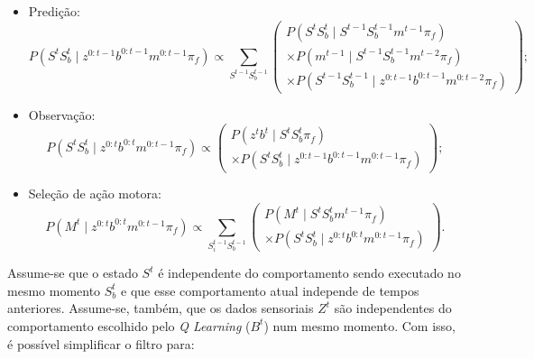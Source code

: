 \begin{itemize}
	\item Predição:
		\begin{equation}
    P \left( S^t S_b^t \mid z^{0: t-1} b^{0: t-1} m^{0: t-1} \pi_f \right) \propto \sum\limits_{S^{t-1} S_b^{t-1}}
        \left(
            \begin{array}{l}
                P \left( S^t S_b^t \mid S^{t-1} S_b^{t-1}  m^{t-1} \pi_f \right) \\
                \times P \left( m^{t-1} \mid S^{t-1} S_b^{t-1} m^{t-2} \pi_f \right)\\
                \times P \left( S^{t-1} S_b^{t-1} \mid z^{0: t-1} b^{0: t-1} m^{0: t-2} \pi_f \right)
            \end{array}
        \right);
		\end{equation}
	\item Observação:
		\begin{equation}
    P \left( S^t S_b^t \mid z^{0: t} b^{0: t} m^{0: t-1} \pi_f \right) \propto
        \left(
            \begin{array}{l}
                P \left( z^t b^t \mid S^t S_b^t \pi_f \right) \\
                \times P \left( S^t S_b^t \mid z^{0: t-1} b^{0: t-1} m^{0: t-1} \pi_f \right)
            \end{array}
        \right);
		\end{equation}
	\item Seleção de ação motora:
		\begin{equation}
    P \left( M^t \mid z^{0: t} b^{0: t} m^{0: t-1} \pi_f \right) \propto \sum\limits_{S_i^{t-1} S_b^{t-1}}
        \left(
            \begin{array}{l}
                P \left( M^t \mid S^t S_b^t m^{t-1} \pi_f \right)\\
                \times P \left( S^t S_b^t \mid z^{0: t} b^{0: t} m^{0: t-1} \pi_f \right)
            \end{array}
        \right).
		\end{equation}
\end{itemize}

Assume-se que o estado $ S^t $ é independente do comportamento sendo executado no mesmo momento $ S_b^t $ e que esse comportamento atual independe de tempos anteriores. Assume-se, também, que os dados sensoriais $ Z^t $ são independentes do comportamento escolhido pelo \textit{Q Learning} ($ B^t $) num mesmo momento. Com isso, é possível simplificar o filtro para:

